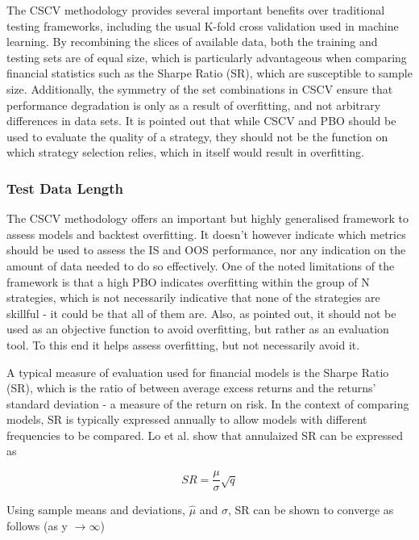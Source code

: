 \documentclass[a4paper,11pt,oneside]{article}
\theoremstyle{plain}
\theoremstyle{definition}
\begin{document}
The CSCV methodology provides several important benefits over traditional testing 
frameworks, including the usual K-fold cross validation used in machine learning. By recombining the slices of 
available data, both the training and testing sets are of equal size, which is particularly advantageous when comparing 
financial statistics such as the Sharpe Ratio (SR), which are susceptible to sample size. Additionally, the symmetry 
of the set combinations in CSCV ensure that performance degradation is only as a result of overfitting, and not 
arbitrary differences in data sets. It is pointed out that while CSCV and PBO should be used to evaluate the quality 
of a strategy, they should not be the function on which strategy selection relies, which in itself would result in overfitting.
\hfill \break 

\subsubsection{Test Data Length}

The CSCV methodology offers an important but highly generalised framework to assess models and backtest 
overfitting. It doesn’t however indicate which metrics should be used to assess the IS and OOS performance, nor 
any indication on the amount of data needed to do so effectively. One of the noted limitations of the framework is 
that a high PBO indicates overfitting within the group of N strategies, which is not necessarily indicative that none 
of the strategies are skillful - it could be that all of them are. Also, as pointed out, it should not be used as an 
objective function to avoid overfitting, but rather as an evaluation tool. To this end it helps assess overfitting, but 
not necessarily avoid it. 
\hfill \break 

A typical measure of evaluation used for financial models is the Sharpe Ratio (SR), which is the ratio of between 
average excess returns and the returns’ standard deviation - a measure of the return on risk. In the context of 
comparing models, SR is typically expressed annually to allow models with different frequencies to be compared. 
Lo et al. \cite{Lo} show that annulaized SR can be expressed as

\begin{equation}\label{SRAnnual}
SR=\frac{\mu}{\sigma}\sqrt{q}
\end{equation}

Using sample means and deviations, $\hat{\mu}$ and $\hat{\sigma}$, SR can be shown to converge as follows 
(as y $\rightarrow\infty$)
\end{document}

